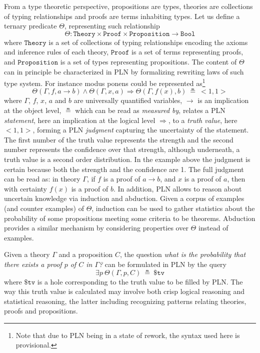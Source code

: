 \documentclass{easychair}
\newcommand{\U}{\Theta}
\newcommand{\Theory}{\texttt{Theory}}
\newcommand{\Proof}{\texttt{Proof}}
\newcommand{\Proposition}{\texttt{Proposition}}
\newcommand{\Bool}{\texttt{Bool}}
\newcommand{\arrow}{\to}
\newcommand{\limp}{\Rightarrow}
\newcommand{\True}{\texttt{True}}
\newcommand{\STV}[2]{<\!#1, #2\!>}
\begin{document}
From a type theoretic perspective, propositions are types, theories
are collections of typing relationships and proofs are terms
inhabiting types.  Let us define a ternary predicate $\U$,
representing such relationship
$$\U : \Theory \times \Proof \times \Proposition \arrow \Bool$$ where
$\Theory$ is a set of collections of typing relationships encoding the
axioms and inference rules of each theory, $\Proof$ is a set of terms
representing proofs, and $\Proposition$ is a set of types representing
propositions.  The content of $\U$ can in principle be characterized
in PLN by formalizing rewriting laws of such type system.  For
instance modus ponens could be represented as\footnote{Note that due
to PLN being in a state of rework, the syntax used here is
provisional.}
$$\U(\Gamma, f, a \to b) \land \U(\Gamma, x, a) \limp \U(\Gamma, f(x),
b)\ \measeq\ \STV{1}{1}$$ where $\Gamma$, $f$, $x$, $a$ and $b$ are
universally quantified variables, $\to$ is an implication at the
object level, $\measeq$ which can be read as \emph{measured by},
relates a PLN \emph{statement}, here an implication at the logical
level $\limp$, to a \emph{truth value}, here $\STV{1}{1}$, forming a
PLN \emph{judgment} capturing the uncertainty of the statement.  The
first number of the truth value represents the strength and the second
number represents the confidence over that strength, although
underneath, a truth value is a second order distribution.  In the
example above the judgment is certain because both the strength and
the confidence are 1.  The full judgment can be read as: in theory
$\Gamma$, if $f$ is a proof of $a \arrow b$, and $x$ is a proof of
$a$, then with certainty $f(x)$ is a proof of $b$.  In addition, PLN
allows to reason about uncertain knowledge via induction and
abduction.  Given a corpus of examples (and counter examples) of
$\Theta$, induction can be used to gather statistics about the
probability of some propositions meeting some criteria to be theorems.
Abduction provides a similar mechanism by considering properties over
$\Theta$ instead of examples.

Given a theory $\Gamma$ and a proposition $C$, the question \emph{what
is the probability that there exists a proof $p$ of $C$ in $\Gamma$?}
can be formulated in PLN by the query
$$\exists p\ \U(\Gamma, p, C)\ \measeq\ \$\texttt{tv}$$ where
$\$\texttt{tv}$ is a hole corresponding to the truth value to be
filled by PLN.  The way this truth value is calculated may involve
both crisp logical reasoning and statistical reasoning, the latter
including recognizing patterns relating theories, proofs and
propositions.
\end{document}
